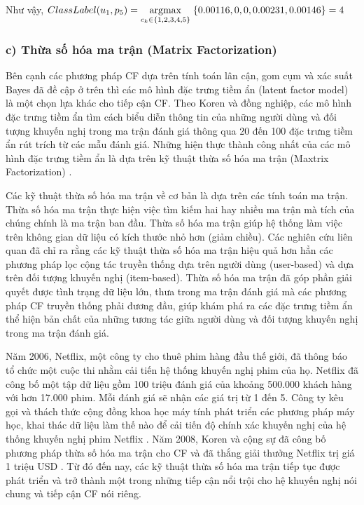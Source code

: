 Như vậy,
$
\displaystyle ClassLabel(u_{1},p_{5}) = 
\underset{c_{k} \in \{1,2,3,4,5\}} {\mathrm{argmax}} \; \{0.00116, 0, 0, 0.00231, 0.00146\} = 4\\
$

\subsubsection*{c) Thừa số hóa ma trận (Matrix Factorization)}
Bên cạnh các phương pháp CF dựa trên tính toán lân cận, gom cụm và xác suất Bayes đã đề cập ở trên thì các mô hình đặc trưng tiềm ẩn (latent factor model) là một chọn lựa khác cho tiếp cận CF. Theo Koren và đồng nghiệp, các mô hình đặc trưng tiềm ẩn tìm cách biểu diễn thông tin của những người dùng và đối tượng khuyến nghị trong ma trận đánh giá thông qua 20 đến 100 đặc trưng tiềm ẩn rút trích từ các mẫu đánh giá. Những hiện thực thành công nhất của các mô hình đặc trưng tiềm ẩn là dựa trên kỹ thuật thừa số hóa ma trận (Maxtrix Factorization) \cite{Koren:2008}.

Các kỹ thuật thừa số hóa ma trận về cơ bản là dựa trên các tính toán ma trận. Thừa số hóa ma trận thực hiện việc tìm kiếm hai hay nhiều ma trận mà tích của chúng chính là ma trận ban đầu. Thừa số hóa ma trận giúp hệ thống làm việc trên không gian dữ liệu có kích thước nhỏ hơn (giảm chiều). Các nghiên cứu liên quan đã chỉ ra rằng các kỹ thuật thừa số hóa ma trận hiệu quả hơn hẳn các phương pháp lọc cộng tác truyền thống dựa trên người dùng (user-based) và dựa trên đối tượng khuyến nghị (item-based). Thừa số hóa ma trận đã góp phần giải quyết được tình trạng dữ liệu lớn, thưa trong ma trận đánh giá mà các phương pháp CF truyền thống phải đương đầu, giúp khám phá ra các đặc trưng tiềm ẩn thể hiện bản chất của những tương tác giữa người dùng và đối tượng khuyến nghị trong ma trận đánh giá.

Năm 2006, Netflix, một công ty cho thuê phim hàng đầu thế giới, đã thông báo tổ chức một cuộc thi nhằm cải tiến hệ thống khuyến nghị phim của họ. Netflix đã công bố một tập dữ liệu gồm 100 triệu đánh giá của khoảng 500.000 khách hàng với hơn 17.000 phim. Mỗi đánh giá sẽ nhận các giá trị từ 1 đến 5. Công ty kêu gọi và thách thức cộng đồng khoa học máy tính phát triển các phương pháp máy học, khai thác dữ liệu làm thế nào để cải tiến độ chính xác khuyến nghị của hệ thống khuyến nghị phim Netflix \cite{bennett2007netflix}. Năm 2008, Koren và cộng sự đã công bố phương pháp thừa số hóa ma trận cho CF và đã thắng giải thưởng Netflix trị giá 1 triệu USD \cite{Koren:2008}. Từ đó đến nay, các kỹ thuật thừa số hóa ma trận tiếp tục được phát triển và trở thành một trong những tiếp cận nổi trội cho hệ khuyến nghị nói chung và tiếp cận CF nói riêng. 

